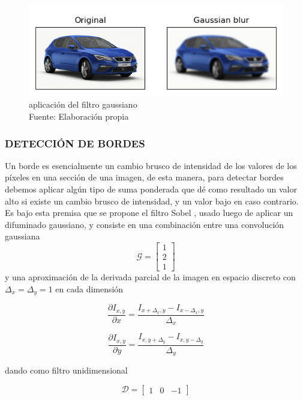         \begin{figure}[H]
            \centering
            \includegraphics[scale=0.48]{imagenes/blur}
            \caption{aplicación del filtro gaussiano\\ Fuente: Elaboración propia}
        \end{figure}
        \subsubsection{DETECCIÓN DE BORDES}
        Un borde es esencialmente un cambio brusco de intensidad de los valores de los píxeles en una sección de una imagen, de esta manera, para detectar bordes debemos aplicar algún tipo de suma ponderada que dé como resultado un valor alto si existe un cambio brusco de intensidad, y un valor bajo en caso contrario. 
        Es bajo esta premisa que se propone el filtro Sobel \citep{sobel}, usado luego de aplicar un difuminado gaussiano, y consiste en una combinación entre una convolución gaussiana
        $$\mathcal{G} = \begin{bmatrix}
                                    1\\
                                    2\\
                                    1
                        \end{bmatrix}$$
        \noindent y una aproximación de la derivada parcial de la imagen en espacio discreto con $\Delta_x = \Delta_y = 1$ en cada dimensión
        
        $$\frac{\partial I_{x, y}}{\partial x} = \frac{I_{x+\Delta_x, y} - I_{x-\Delta_x, y}}{\Delta_x}$$
        
        $$\frac{\partial I_{x, y}}{\partial y} = \frac{I_{x, y+\Delta_y} - I_{x, y-\Delta_y}}{\Delta_y}$$
        
        \noindent dando como filtro unidimensional
        
        $$\mathcal{D} = \begin{bmatrix}
                                    1 & 0 & -1
                        \end{bmatrix}$$
                        
